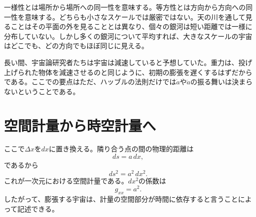 一様性とは場所から場所への同一性を意味する。等方性とは方向から方向への同一性を意味する。どちらも小さなスケールでは厳密ではない。天の川を通して見ることはその平面の外を見ることとは異なり、個々の銀河は短い距離では一様に分布していない。しかし多くの銀河について平均すれば、大きなスケールの宇宙はどこでも、どの方向でもほぼ同じに見える。

\begin{classroomqa}
\end{classroomqa}

長い間、宇宙論研究者たちは宇宙は減速していると予想していた。重力は、投げ上げられた物体を減速させるのと同じように、初期の膨張を遅くするはずだからである。ここでの要点はただ、ハッブルの法則だけでは\(\dot a\)や\(\ddot a\)の振る舞いは決まらないということである。

\begin{classroomqa}
\end{classroomqa}

\section{空間計量から時空計量へ}

ここで\(\Delta x\)を\(dx\)に置き換える。隣り合う点の間の物理的距離は
\begin{equation}
ds=a\,dx,
\end{equation}
であるから
\begin{equation}
ds^2=a^2\,dx^2.
\end{equation}
これが一次元における空間計量である。\(dx^2\)の係数は
\begin{equation}
g_{xx}=a^2.
\end{equation}
したがって、膨張する宇宙は、計量の空間部分が時間に依存すると言うことによって記述できる。

